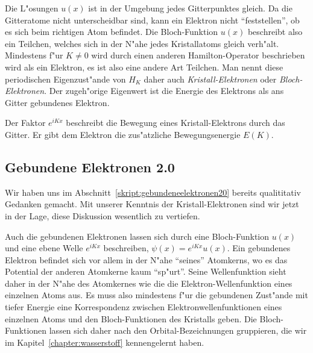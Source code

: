 Die L"osungen $u(x)$ ist in der Umgebung jedes Gitterpunktes gleich.
Da die Gitteratome nicht unterscheidbar sind, kann ein Elektron
nicht ``feststellen'', ob es sich beim richtigen Atom befindet.
Die Bloch-Funktion $u(x)$ beschreibt also ein Teilchen,
welches sich in der N"ahe jedes Kristallatoms gleich verh"alt.
Mindestens f"ur $K\ne 0$ wird durch einen anderen Hamilton-Operator
beschrieben wird als ein Elektron, es ist also eine andere Art
Teilchen.
Man nennt diese periodischen Eigenzust"ande von $H_K$ daher auch
{\em Kristall-Elektronen}
oder
{\em Bloch-Elektronen}.
%
%
Der zugeh"orige Eigenwert ist die Energie des Elektrons als ans Gitter
gebundenes Elektron.

Der Faktor $e^{iKx}$ beschreibt die Bewegung eines Kristall-Elektrons
durch das Gitter. Er gibt dem Elektron die zus"atzliche Bewegungsenergie
$E(K)$.

\subsection{Gebundene Elektronen 2.0\label{skript:gebundeneelektronen20}}
Wir haben uns im Abschnitt~\ref{skript:gebundeneelektronen20} bereits 
qualititativ Gedanken gemacht.
Mit unserer Kenntnis der Kristall-Elektronen sind wir jetzt in der Lage,
diese Diskussion wesentlich zu vertiefen.

Auch die gebundenen Elektronen lassen sich durch eine Bloch-Funktion $u(x)$ 
und eine ebene Welle $e^{iKx}$ beschreiben, $\psi(x)=e^{iKx}u(x)$.
Ein gebundenes Elektron befindet sich vor allem in der N"ahe ``seines''
Atomkerns, wo es das Potential der anderen Atomkerne kaum ``sp"urt''.
Seine Wellenfunktion sieht daher in der N"ahe des Atomkernes wie die die
Elektron-Wellenfunktion eines einzelnen Atoms aus.
Es muss also mindestens f"ur die gebundenen Zust"ande mit tiefer Energie
eine Korrespondenz zwischen Elektronwellenfunktionen eines einzelnen
Atoms und den Bloch-Funktionen des Kristalls geben. Die Bloch-Funktionen
lassen sich daher nach den Orbital-Bezeich\-nungen gruppieren, die wir
im Kapitel~\ref{chapter:wasserstoff} kennengelernt haben.


